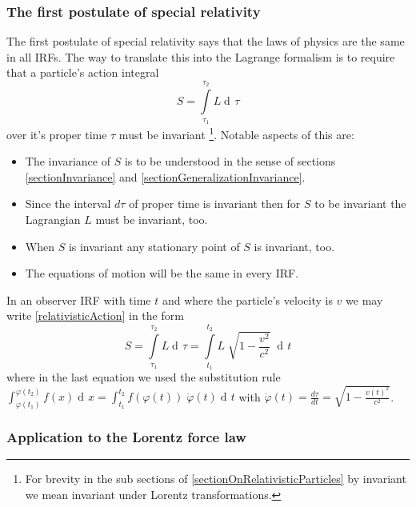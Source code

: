 \documentclass{article}
\DeclareMathOperator{\dd}{d\!}
\begin{document}
\subsubsection{The first postulate of special relativity} \label{sectionFirstPostulate}
The first postulate of special relativity says that the laws of physics are the same in all IRFs.
The way to translate this into the Lagrange formalism is to require that a particle's action integral
\begin{equation} \label{relativisticAction}
    S = \int\limits_{\tau_1}^{\tau_2} L \dd \tau
\end{equation}
over it's proper time $\tau$ must be invariant
\footnote{For brevity in the sub sections of \ref{sectionOnRelativisticParticles} by invariant we mean invariant under Lorentz transformations.}.
Notable aspects of this are:
\begin{itemize}
    \item The invariance of $S$ is to be understood in the sense of sections \ref{sectionInvariance} and \ref{sectionGeneralizationInvariance}.
    \item Since the interval $d  \tau$ of proper time is invariant then for $S$ to be invariant the Lagrangian $L$ must be invariant, too.
    \item When $S$ is invariant any stationary point of $S$ is invariant, too.
    \item The equations of motion will be the same in every IRF.
\end{itemize}
In an observer IRF with time $t$ and where the particle's velocity is $v$ we may write \ref{relativisticAction} in the form
\begin{equation} \label{relativisticActionWithObserver}
    S = \int\limits_{\tau_1}^{\tau_2} L \dd \tau = \int\limits_{t_1}^{t_2} L \; \sqrt{1-\frac{v^2}{c^2}} \; \dd t
\end{equation}
where in the last equation we used the substitution rule $\int_{\varphi(t_1)}^{\varphi(t_2)} f(x) \dd x = \int_{t_1}^{t_2} f(\varphi(t)) \; \dot{\varphi}(t) \dd t$ with $\dot{\varphi}(t)= \frac{d \tau}{d t} = \sqrt{1-\frac{v(t)^2}{c^2}}$.


\subsubsection{Application to the Lorentz force law} \label{sectionConsequencesOfInvarianceLorentzForce}
\end{document}
